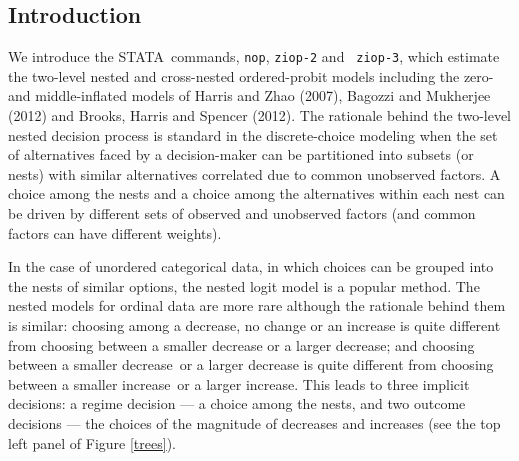 \documentclass[letterpaper,fleqn,12pt]{article}
\begin{document}
\begin{onehalfspace}%

\section{Introduction}

We introduce the STATA\ commands, \texttt{nop}, \texttt{ziop-2} and \texttt{%
ziop-3}, which estimate the two-level nested and cross-nested ordered-probit
models including the zero- and middle-inflated models of Harris and Zhao
(2007), Bagozzi and Mukherjee (2012) and Brooks, Harris and Spencer (2012).
The rationale behind the two-level nested decision process is standard in
the discrete-choice modeling when the set of alternatives faced by a
decision-maker can be partitioned into subsets (or nests) with similar
alternatives correlated due to common unobserved factors. A choice among the
nests and a choice among the alternatives within each nest can be driven by
different sets of observed and unobserved factors (and common factors can
have different weights).

In the case of unordered categorical data, in which choices can be grouped
into the nests of similar options, the nested logit model is a popular
method. The nested models for ordinal data are more rare although the
rationale behind them is similar: choosing among a decrease, no change or an
increase is quite different from choosing between a smaller decrease or a
larger decrease; and choosing between a smaller decrease\ or a larger
decrease is quite different from choosing between a smaller increase\ or a
larger increase. This leads to three implicit decisions: a regime decision
--- a choice among the nests, and two outcome decisions --- the choices of
the magnitude of decreases and increases (see the top left panel of Figure %
\ref{trees}).

\end{onehalfspace}%
\end{document}
